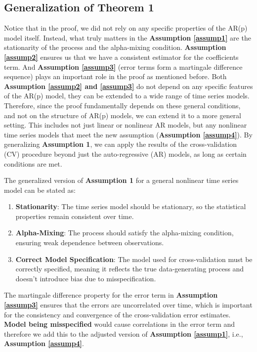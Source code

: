 \documentclass[12pt, oneside]{amsart}
\theoremstyle{definition}
\theoremstyle{remark}
\numberwithin{equation}{section}
\begin{document}
\subsection{Generalization of Theorem 1}
Notice that in the proof, we did not rely on any specific properties of the AR(p) model itself. Instead, what truly matters in the \textbf{Assumption \ref{assump1}} are the stationarity of the process and the alpha-mixing condition. \textbf{Assumption \ref{assump2}} ensures us that we have a consistent estimator for the coefficients term. And \textbf{Assumption \ref{assump3}} (error terms form a martingale difference sequence) plays an important role in the proof as mentioned before. Both \textbf{Assumption \ref{assump2} and \ref{assump3}} do not depend on any specific features of the AR(p) model, they can be extended to a wide range of time series models. \\

Therefore, since the proof fundamentally depends on these general conditions, and not on the structure of AR(p) models, we can extend it to a more general setting. This includes not just linear or nonlinear AR models, but any nonlinear time series models that meet the new assumption (\textbf{Assumption \ref{assump4}}). By generalizing \textbf{Assumption 1}, we can apply the results of the cross-validation (CV) procedure beyond just the auto-regressive (AR) models, as long as certain conditions are met.

\begin{assumption}\label{assump4}
    The generalized version of \textbf{Assumption 1} for a general nonlinear time series model can be stated as:
\begin{enumerate}
    \item \textbf{Stationarity}: The time series model should be stationary, so the statistical properties remain consistent over time.
    \item \textbf{Alpha-Mixing}: The process should satisfy the alpha-mixing condition, ensuring weak dependence between observations.
    \item \textbf{Correct Model Specification}: The model used for cross-validation must be correctly specified, meaning it reflects the true data-generating process and doesn't introduce bias due to misspecification.
\end{enumerate}
\end{assumption}
The martingale difference property for the error term in \textbf{Assumption \ref{assump3}} ensures that the errors are uncorrelated over time, which is important for the consistency and convergence of the cross-validation error estimates. \textbf{Model being misspecified} would cause correlations in the error term and therefore we add this to the adjusted version of \textbf{Assumption \ref{assump1}}, i.e., \textbf{Assumption \ref{assump4}}.
\end{document}
